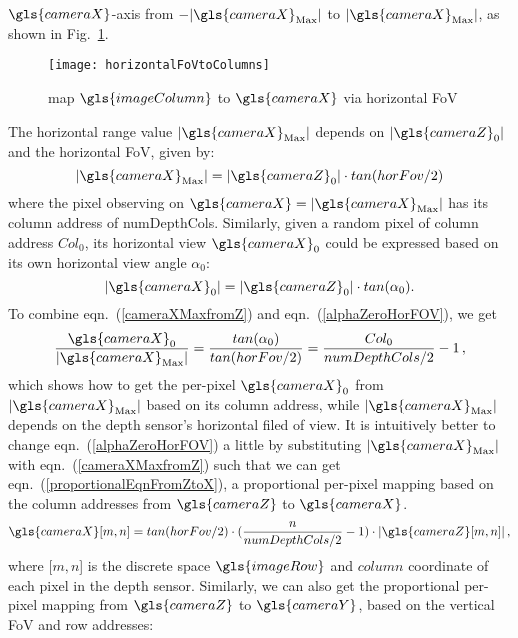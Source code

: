 \(\gls{cameraX}\)-axis from \(-|\gls{cameraX}_{\text{Max}}|\) to \(|\gls{cameraX}_{\text{Max}}|\), as shown in Fig.~\ref{horizontalFoVtoColumns}. %
\begin{figure}[!t]
\centering
\texttt{[image: horizontalFoVtoColumns]}
\caption{map \(\gls{imageColumn}\) to \(\gls{cameraX}\) via horizontal \gls{FoV}}
\label{horizontalFoVtoColumns}
\end{figure}%
%
The horizontal range value \(|\gls{cameraX}_{\text{Max}}|\) depends on \(|\gls{cameraZ}_0|\) and the horizontal \gls{FoV}, given by:
%
\begin{equation}
|\gls{cameraX}_{\text{Max}}| = |\gls{cameraZ}_0| \cdot tan(horFov / 2) 
\label{cameraXMaxfromZ}
\end{equation}%
\noindent
where the pixel observing on \(\gls{cameraX} = |\gls{cameraX}_{\text{Max}}|\) has its column address of numDepthCols. Similarly, given a random pixel of column address \(Col_0\), its horizontal view \(\gls{cameraX}_0\) could be expressed based on its own horizontal view angle \(\alpha_0\):
%
\begin{equation}
|\gls{cameraX}_{0}| = |\gls{cameraZ}_0| \cdot tan(\alpha_0)  .
\label{alphaZeroHorFOV}
\end{equation}%
\noindent
To combine eqn.~(\ref{cameraXMaxfromZ}) and eqn.~(\ref{alphaZeroHorFOV}), we get
%
\begin{equation}
\frac{\gls{cameraX}_0}{|\gls{cameraX}_{\text{Max}}|} = \frac{tan(\alpha_0)}{tan(horFov / 2)} = \frac{Col_0}{numDepthCols/2} - 1\, ,
\label{alphaZeroHorFOV}
\end{equation}%
\noindent
which shows how to get the per-pixel \(\gls{cameraX}_0\) from \(|\gls{cameraX}_{\text{Max}}|\) based on its column address, while \(|\gls{cameraX}_{\text{Max}}|\) depends on the depth sensor's horizontal filed of view. It is intuitively better to change eqn.~(\ref{alphaZeroHorFOV}) a little by substituting \(|\gls{cameraX}_{\text{Max}}|\) with eqn.~(\ref{cameraXMaxfromZ}) such that we can get eqn.~(\ref{proportionalEqnFromZtoX}), a proportional per-pixel mapping based on the column addresses from \(\gls{cameraZ}\) to \(\gls{cameraX}\).
%
\begin{equation}
\gls{cameraX}[m, n] = tan(horFov / 2) \cdot (\frac{n}{numDepthCols/2} - 1) \cdot |\gls{cameraZ}[m, n]|\, ,
\label{proportionalEqnFromZtoX}
\end{equation}%
\noindent
where [\(m,n\)] is the discrete space \(\gls{imageRow}\) and \(column\) coordinate of each pixel in the depth sensor. Similarly, we can also get the proportional per-pixel mapping from \(\gls{cameraZ}\) to \(\gls{cameraY}\), based on the vertical \gls{FoV} and row addresses:
